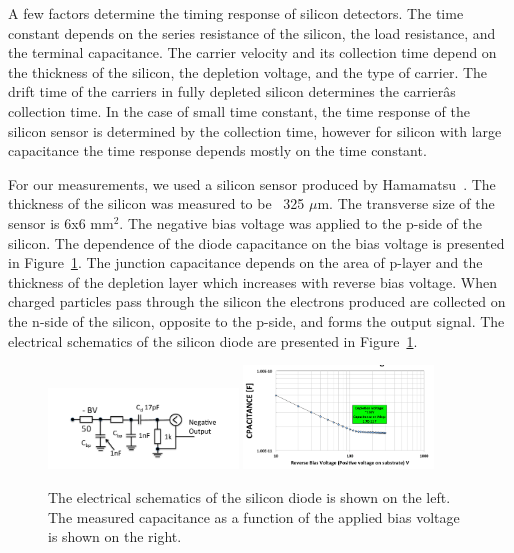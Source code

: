 \documentclass[12pt]{article}
\begin{document}
{A few factors determine the timing response of silicon detectors. The
time constant depends on the series resistance of the silicon, the load
resistance, and the terminal capacitance. The carrier velocity and its collection
time depend on the thickness of the silicon, the depletion voltage, and the type of
carrier. The drift time of the carriers in fully depleted silicon determines the 
carrierâs collection time. In the case of small time constant, the time
response of the silicon sensor is determined by the collection time, however
for silicon with large capacitance the time response depends mostly on the
time constant.

For our measurements, we used a silicon sensor produced by
Hamamatsu~\cite{hamamatsu}. The thickness of the silicon was measured to be ~325
$\mu$m. The transverse size of the sensor is 6x6 mm$^2$. The negative bias
voltage was applied to the p-side of the silicon. The dependence of the diode
capacitance on the bias voltage is presented in Figure~\ref{fig:SiliconDiode}.
The junction capacitance depends on the area of p-layer and the thickness of the
depletion layer which increases with reverse bias voltage. When charged
particles pass through the silicon the electrons produced are collected on the
n-side of the silicon, opposite to the p-side, and forms the output signal. The
electrical schematics of the silicon diode are presented in
Figure~\ref{fig:SiliconDiode}.


\begin{figure}[htbp] 
\centering
\includegraphics[width=0.45\textwidth]{plots/SiliconDiodeDiagram.pdf} 
\includegraphics[width=0.45\textwidth]{plots/SiliconDiodeCV.png} 
\caption{The electrical schematics of the silicon diode is shown on the left. The measured
capacitance as a function of the applied bias voltage is shown on the right. } 
\label{fig:SiliconDiode} 
\end{figure} 


}
\end{document}
